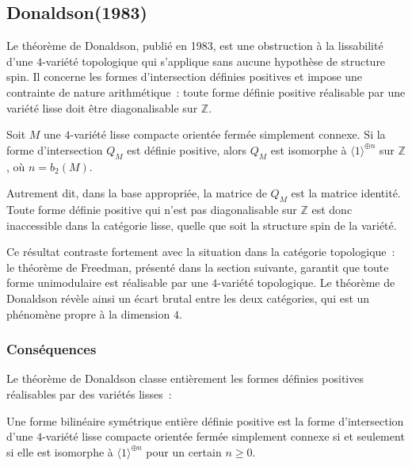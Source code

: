 
\subsection{Donaldson(1983)}

Le théorème de Donaldson, publié en 1983, est une obstruction à la lissabilité d'une
$4$-variété topologique qui s'applique sans aucune hypothèse de structure spin. Il concerne
les formes d'intersection définies positives et impose une contrainte de nature
arithmétique~: toute forme définie positive réalisable par une variété lisse doit être
diagonalisable sur $\mathbb{Z}$.

\begin{theorem}[Donaldson, 1983]\label{thm:donaldson}
  Soit $M$ une $4$-variété lisse compacte orientée fermée simplement connexe. Si la forme
  d'intersection $Q_M$ est définie positive, alors $Q_M$ est isomorphe à
  $\langle 1 \rangle^{\oplus n}$ sur $\mathbb{Z}$, où $n = b_2(M)$.
\end{theorem}

Autrement dit, dans la base appropriée, la matrice de $Q_M$ est la matrice identité. Toute
forme définie positive qui n'est pas diagonalisable sur $\mathbb{Z}$ est donc inaccessible
dans la catégorie lisse, quelle que soit la structure spin de la variété.

\medskip

Ce résultat contraste fortement avec la situation dans la catégorie topologique~: le théorème
de Freedman, présenté dans la section suivante, garantit que toute forme unimodulaire est
réalisable par une $4$-variété topologique. Le théorème de Donaldson révèle ainsi un écart
brutal entre les deux catégories, qui est un phénomène propre à la dimension $4$.

\subsubsection*{Conséquences}

Le théorème de Donaldson classe entièrement les formes définies positives réalisables par des
variétés lisses~:

\begin{corollary}\label{cor:donaldson_classification}
  Une forme bilinéaire symétrique entière définie positive est la forme d'intersection d'une
  $4$-variété lisse compacte orientée fermée simplement connexe si et seulement si elle est
  isomorphe à $\langle 1 \rangle^{\oplus n}$ pour un certain $n \geq 0$.
\end{corollary}

